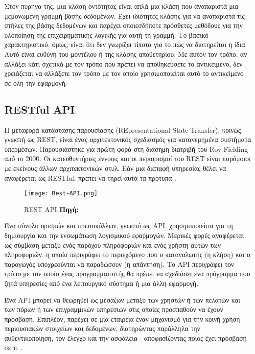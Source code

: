 Στον πυρήνα της, μια κλάση οντότητας είναι απλά μια κλάση που αναπαριστά μια μεμονωμένη γραμμή βάσης δεδομένων. Έχει ιδιότητες κλάσης για να αναπαριστά τις στήλες της βάσης δεδομένων και παρέχει οποιεσδήποτε πρόσθετες μεθόδους για την υλοποίηση της επιχειρηματικής λογικής για αυτή τη γραμμή. Το βασικό χαρακτηριστικό, όμως, είναι ότι δεν γνωρίζει τίποτα για το πώς να διατηρείται η ίδια. Αυτό είναι ευθύνη του μοντέλου ή της κλάσης αποθετηρίου. Με αυτόν τον τρόπο, αν αλλάξει κάτι σχετικά με τον τρόπο που πρέπει να αποθηκεύσετε το αντικείμενο, δεν χρειάζεται να αλλάξετε τον τρόπο με τον οποίο χρησιμοποιείται αυτό το αντικείμενο σε όλη την εφαρμογή.

\subsection{RESTful API}
Η μεταφορά κατάστασης παρουσίασης (REpresentational State Transfer), κοινώς γνωστή ως REST, είναι ένας αρχιτεκτονικός σχεδιασμός για κατανεμημένα συστήματα υπερμέσων. Παρουσιάστηκε για πρώτη φορά στη διάσημη διατριβή του Roy Fielding από το 2000.
Οι κατευθυντήριες έννοιες και οι περιορισμοί του REST είναι παρόμοιοι με εκείνους άλλων αρχιτεκτονικών στυλ. Εάν μια διεπαφή υπηρεσίας θέλει να αναφέρεται ως RESTful, πρέπει να τηρεί αυτά τα πρότυπα \cite{Gupta_2020}.

\begin{figure}[ht]
	\centering
	\texttt{[image: Rest-API.png]}
	\caption[{REST API}]{REST API \textbf{Πηγή:} \parencite{fig_Rest_API}}
	\label{fig:rest_api}
\end{figure}

Ένα σύνολο ορισμών και πρωτοκόλλων, γνωστό ως API, χρησιμοποιείται για τη δημιουργία και την ενσωμάτωση λογισμικού εφαρμογών. Μερικές φορές αναφέρεται ως σύμβαση μεταξύ ενός παρόχου πληροφοριών και ενός χρήστη αυτών των πληροφοριών, η οποία περιγράφει το περιεχόμενο που ο καταναλωτής (η κλήση) και ο παραγωγός υποχρεούνται να παραδώσουν (η απάντηση). Το API περιγράφει τον τρόπο με τον οποίο ένας προγραμματιστής θα πρέπει να σχεδιάσει ένα πρόγραμμα που ζητά υπηρεσίες από ένα λειτουργικό σύστημα ή μια άλλη εφαρμογή. 

Ένα API μπορεί να θεωρηθεί ως μεσάζων μεταξύ των χρηστών ή των πελατών και των πόρων ή των επιγραμμικών υπηρεσιών στις οποίες προσπαθούν να έχουν πρόσβαση. Επιπλέον, παρέχει σε μια εταιρεία έναν μηχανισμό για την κοινή χρήση περιουσιακών στοιχείων και δεδομένων, διατηρώντας παράλληλα την αυθεντικοποίηση, τον έλεγχο και την ασφάλεια - αποφασίζοντας ποιος έχει πρόσβαση σε τι \cite{RedHat_2020}. 

